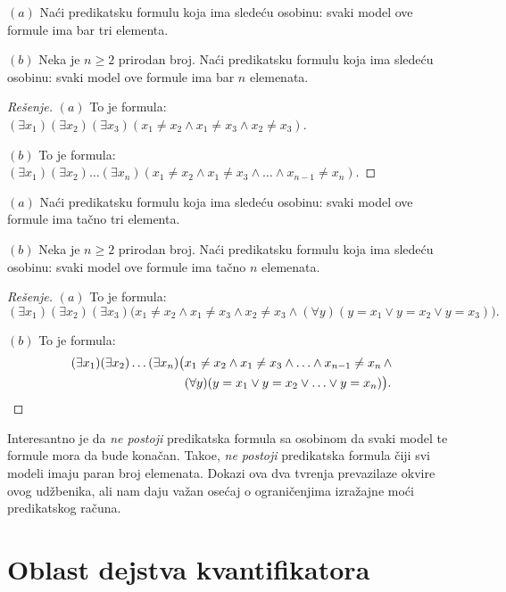 \begin{EX}
  $(a)$ Na\'ci predikatsku formulu koja ima slede\'cu osobinu: svaki model ove formule ima bar tri elementa.
  
  $(b)$ Neka je $n \ge 2$ prirodan broj.
  Na\'ci predikatsku formulu koja ima slede\'cu osobinu: svaki model ove formule ima bar $n$ elemenata.
\end{EX}
\begin{proof}[Re\v senje]
  $(a)$ To je formula: $(\exists x_1)(\exists x_2)(\exists x_3)(x_1 \ne x_2 \land x_1 \ne x_3 \land x_2 \ne x_3)$.
  
  $(b)$ To je formula: $(\exists x_1)(\exists x_2)\ldots (\exists x_n)(x_1 \ne x_2 \land x_1 \ne x_3 \land \ldots \land x_{n-1} \ne x_n)$.
\end{proof}

\begin{EX}
  $(a)$ Na\'ci predikatsku formulu koja ima slede\'cu osobinu: svaki model ove formule ima ta\v cno tri elementa.
  
  $(b)$ Neka je $n \ge 2$ prirodan broj.
  Na\'ci predikatsku formulu koja ima slede\'cu osobinu: svaki model ove formule ima ta\v cno $n$ elemenata.
\end{EX}
\begin{proof}[Re\v senje]
  $(a)$ To je formula:
  $$
    (\exists x_1)(\exists x_2)(\exists x_3)\big(x_1 \ne x_2 \land x_1 \ne x_3 \land x_2 \ne x_3 \land (\forall y)(y = x_1 \lor y = x_2 \lor y = x_3)\big).
  $$
  
  $(b)$ To je formula:
  \begin{align*}
    (\exists x_1)(\exists x_2)\ldots (\exists x_n)\big(&x_1 \ne x_2 \land x_1 \ne x_3 \land \ldots \land x_{n-1} \ne x_n \,\land\\
                                                       &(\forall y)(y = x_1 \lor y = x_2 \lor \ldots \lor y = x_n)\big). \qedhere
  \end{align*}
\end{proof}

Interesantno je da \emph{ne postoji} predikatska formula sa osobinom da svaki model te formule mora da bude kona\v can.
Tako\dj e, \emph{ne postoji} predikatska formula \v ciji svi modeli imaju paran broj elemenata.
Dokazi ova dva tvr\dj enja prevazilaze okvire ovog ud\v zbenika, ali nam daju va\v zan ose\'caj o ograni\v cenjima
izra\v zajne mo\'ci predikatskog ra\v cuna.


\section{Oblast dejstva kvantifikatora}

